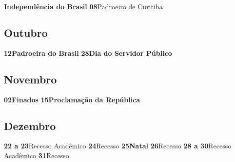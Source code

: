 \documentclass[thesis]{hmcposter}
\begin{document}
\begin{poster}
\quad \quad \textbf{Independência do Brasil} \newline\textbf{08}\quad \quad \quad \quad Padroeiro de Curitiba \subsection{Outubro}\textbf{12}\quad \quad \quad \quad \textbf{Padroeira do Brasil} \newline\textbf{28}\quad \quad \quad \quad \textbf{Dia do Servidor Público} \subsection{Novembro}\textbf{02}\quad \quad \quad \quad \textbf{Finados} \newline\textbf{15}\quad \quad \quad \quad \textbf{Proclamação da República} \subsection{Dezembro}\textbf{22 a 23}\quad \quad Recesso Acadêmico \newline\textbf{24}\quad \quad \quad \quad Recesso \newline\textbf{25}\quad \quad \quad \quad \textbf{Natal} \newline\textbf{26}\quad \quad \quad \quad Recesso \newline\textbf{28 a 30}\quad \quad Recesso Acadêmico \newline\textbf{31}\quad \quad \quad \quad Recesso \newline\newpage

\end{poster}
\end{document}
